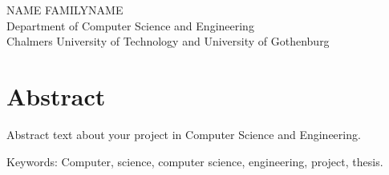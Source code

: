 \oneLineTitle\\
\oneLineSubtitle\\
NAME FAMILYNAME\\
Department of Computer Science and Engineering\\
Chalmers University of Technology and University of Gothenburg

\thispagestyle{plain}			%
\section*{Abstract}
Abstract text about your project in  Computer Science and Engineering.

\vfill
Keywords: Computer, science, computer science, engineering, project, thesis.

\newpage				%
\thispagestyle{empty}
\mbox{}